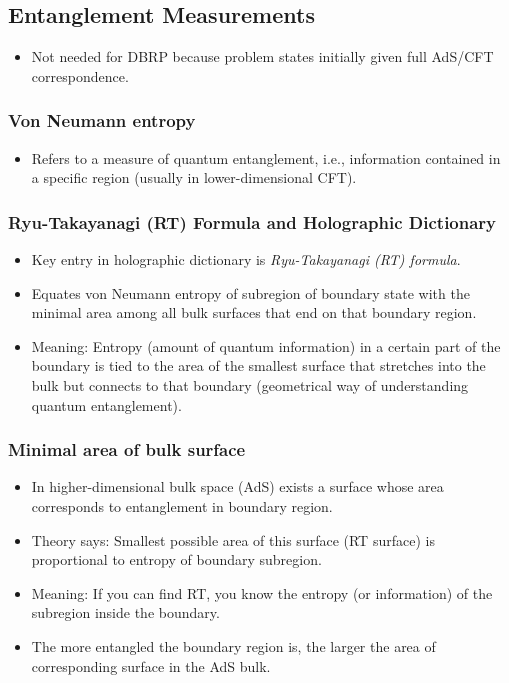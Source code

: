 \documentclass[12pt]{article}
\begin{document}
\subsection*{Entanglement Measurements}
\begin{itemize}
    \item Not needed for DBRP because problem states initially given full AdS/CFT correspondence.
\end{itemize}

\subsubsection*{Von Neumann entropy}
\begin{itemize}
    \item Refers to a measure of quantum entanglement, i.e., information contained in a specific region (usually in lower-dimensional CFT).
\end{itemize}

\subsubsection*{Ryu-Takayanagi (RT) Formula and Holographic Dictionary}
\begin{itemize}
    \item Key entry in holographic dictionary is \textit{Ryu-Takayanagi (RT) formula}.
    \item Equates von Neumann entropy of subregion of boundary state with the minimal area among all bulk surfaces that end on that boundary region.
    \item Meaning: Entropy (amount of quantum information) in a certain part of the boundary is tied to the area of the smallest surface that stretches into the bulk but connects to that boundary (geometrical way of understanding quantum entanglement).
\end{itemize}

\subsubsection*{Minimal area of bulk surface}
\begin{itemize}
    \item In higher-dimensional bulk space (AdS) exists a surface whose area corresponds to entanglement in boundary region.
    \item Theory says: Smallest possible area of this surface (RT surface) is proportional to entropy of boundary subregion.
    \item Meaning: If you can find RT, you know the entropy (or information) of the subregion inside the boundary.
    \item The more entangled the boundary region is, the larger the area of corresponding surface in the AdS bulk.
\end{itemize}
\end{document}
